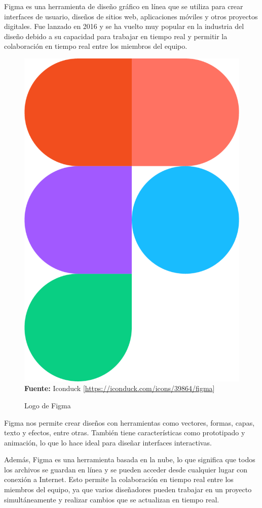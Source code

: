 Figma es una herramienta de diseño gráfico en línea que se utiliza para crear
interfaces de usuario, diseños de sitios web, aplicaciones móviles y otros
proyectos digitales. Fue lanzado en 2016 y se ha vuelto muy popular en la
industria del diseño debido a su capacidad para trabajar en tiempo real y
permitir la colaboración en tiempo real entre los miembros del equipo.
\begin{figure}[htb!]
    \centering
    \caption{Logo de Figma}
    \label{fig:figma-logo}
    \centering
    \includegraphics[scale=0.05]{./Ilustraciones/logos/figma.684x1024.png}\\
    \textbf{Fuente:} Iconduck [\url{https://iconduck.com/icons/39864/figma}]
\end{figure}
Figma nos permite crear diseños con herramientas como vectores,
formas, capas, texto y efectos, entre otras. También tiene características como
prototipado y animación, lo que lo hace ideal para diseñar interfaces interactivas.

Además, Figma es una herramienta basada en la nube, lo que significa que todos
los archivos se guardan en línea y se pueden acceder desde cualquier lugar con
conexión a Internet. Esto permite la colaboración en tiempo real entre los
miembros del equipo, ya que varios diseñadores pueden trabajar en un proyecto
simultáneamente y realizar cambios que se actualizan en tiempo real.